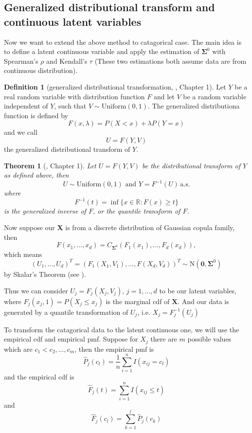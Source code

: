 \documentclass{article}
\newtheorem{theorem}{Theorem}[section]
\theoremstyle{definition}
\newtheorem{definition}{Definition}[section]
\begin{document}
	\subsection{Generalized distributional transform and continuous latent variables}
	Now we want to extend the above method to catagorical case. The main idea is to define a latent continuous variable and apply the estimation of $\bm \Sigma^0$ with Spearman's $\rho$ and Kendall's $\tau$ (These two estimations both assume data are from continuous distribution). 
 	\begin{definition}[generalized distributional transformation, \cite{ruschendorf2013mathematical}, Chapter 1]
 	Let $Y$ be a real random variable with distribution function $F$ and let $V$ be a random variable independent of $Y$, such that $V \sim \mathrm{Uniform}(0,1)$. The generalized distributiona function is defined by
 	\[F(x, \lambda) = P(X < x) + \lambda P(Y = x)\]
 	and we call
 	\[U = F(Y, V)\]
 	the generalized distributional transform of $Y$.
	\end{definition}

	\begin{theorem}[\cite{ruschendorf2013mathematical}, Chapter 1]
	Let $U = F(Y, V)$ be the distributional transform of $Y$ as defined above, then
	\[U \sim \mathrm{Uniform}(0,1) \, \, \mathrm{and}\,\, Y = F^{-1}(U) \, \mathrm{a.s.} \] 
	where 
	\[F^{-1}(t) = \inf\{x \in \mathbb{R} : F(x) \geq t\}\]
	is the generalized inverse of $F$, or the quantile transform of $F$. 
	\end{theorem}

	Now suppose our $\bm X$ is from a discrete distribution of Gaussian copula family, then 
	\[F(x_1, \ldots, x_d) = C_{\bm \Sigma^0}(F_1(x_1), \ldots, F_d(x_d)),\]
	which means
	\[(U_1, \ldots, U_d)^T = (F_1(X_1, V_1), \ldots, F(X_d, V_d))^T \sim \mathrm{N}(\bm 0, \bm \Sigma^0)\]
	by Skalar's Theorem (see \cite{ruschendorf2013mathematical}).

	Thus we can consider $U_j = F_j(X_j, V_j),\, j = 1,\ldots,d$ to be our latent variables, where $F_j(x_j, 1) = P(X_j \leq x_j)$ is the marginal cdf of $\bm X$. And our data is generated by a quantile transformation of $U_j$, i.e. $X_j = F^{-1}_j (U_j)$ 

	To transform the catagorical data to the latent continuous one, we will use the empirical cdf and empirical pmf. Suppose for $X_j$ there are $m$ possible values which are $c_1 < c_2, \ldots, c_m$, then the empirical pmf is
	\[\hat{P}_j(c_l) = \frac{1}{n} \sum_{i=1}^n I(x_{ij} = c_l)\]
	and the empirical cdf is
	\[\hat{F}_j(t) = \sum_{i=1}^n I(x_{ij} \leq t)\]
	and 
	\[\hat{F}_j(c_l) = \sum_{k=1}^l \hat{P}_j(c_k)\]
\end{document}
